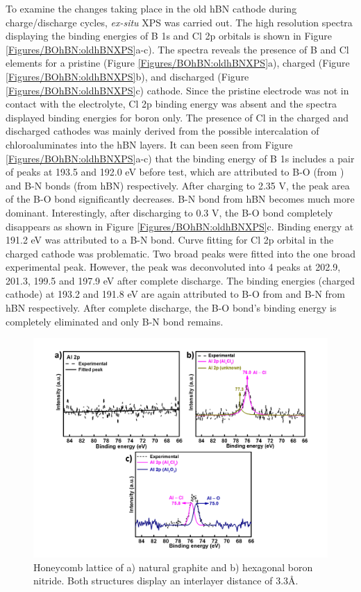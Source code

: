 To examine the changes taking place in the old hBN cathode during charge/discharge cycles, \textit{ex-situ} XPS was carried out. The high resolution spectra displaying the binding energies of B 1s and Cl 2p orbitals is shown in Figure \ref{Figures/BOhBN:oldhBNXPS}a-c). The spectra reveals the presence of B and Cl elements for a pristine (Figure \ref{Figures/BOhBN:oldhBNXPS}a), charged (Figure \ref{Figures/BOhBN:oldhBNXPS}b), and discharged (Figure \ref{Figures/BOhBN:oldhBNXPS}c) cathode. Since the pristine electrode was not in contact with the electrolyte, Cl 2p binding energy was absent and the spectra displayed binding energies for boron only. The presence of Cl in the charged and discharged cathodes was mainly derived from the possible intercalation of chloroaluminates into the hBN layers. It can been seen from Figure \ref{Figures/BOhBN:oldhBNXPS}a-c) that the binding energy of B 1s includes a pair of peaks at 193.5 and 192.0 eV before test, which are attributed to B-O (from ) and B-N bonds (from hBN) respectively. After charging to 2.35 V, the peak area of the B-O bond significantly decreases. B-N bond from hBN becomes much more dominant. Interestingly, after discharging to 0.3 V, the B-O bond completely disappears as shown in Figure \ref{Figures/BOhBN:oldhBNXPS}c. Binding energy at 191.2 eV was attributed to a B-N bond. Curve fitting for Cl 2p orbital in the charged cathode was problematic. Two broad peaks were fitted into the one broad experimental peak. However, the peak was deconvoluted into 4 peaks at 202.9, 201.3, 199.5 and 197.9 eV after complete discharge. The binding energies (charged cathode) at 193.2 and 191.8 eV are again attributed to B-O from  and B-N from hBN respectively. After complete discharge, the B-O bond's binding energy is completely eliminated and only B-N bond remains.

\begin{figure}[tbh!]
\centering
\includegraphics[width=\textwidth]{Figures/BOhBN/hBNAlXPS}
\caption{Honeycomb lattice of a) natural graphite and b) hexagonal boron nitride. Both structures display an interlayer distance of 3.3\AA.}
\label{Figures/BOhBN:hBNAlXPS}
\end{figure}

